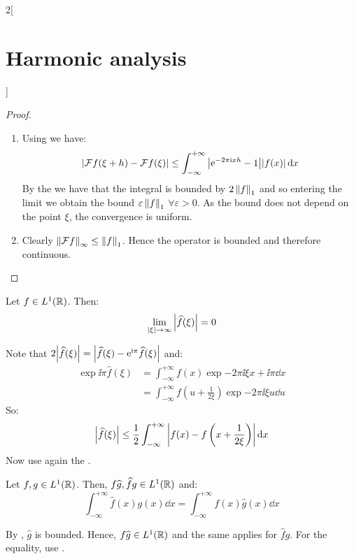 \documentclass[../../../main_math.tex]{subfiles}
\begin{document}
\begin{multicols}{2}[\section{Harmonic analysis}]
\begin{proposition}
  \end{proposition}
  \begin{proof}
    \begin{enumerate}
      \item Using  we have:
            $$\abs{\mathcal{F} f(\xi+h)-\mathcal{F} f(\xi)}\leq \int_{-\infty}^{+\infty}\abs{\mathrm{e}^{-2\pi\mathrm{i} x h}-1}\abs{f(x)}\dd{x}$$
            By the  we have that the integral is bounded by $2\left\|f\right\|_1$ and so entering the limit we obtain the bound $\varepsilon \left\|f\right\|_1$ $\forall \varepsilon>0$. As the bound does not depend on the point $\xi$, the convergence is uniform.
      \item Clearly $\left\|\mathcal{F} f\right\|_{\infty}\leq \left\|f\right\|_1$. Hence the operator is bounded and therefore continuous.
    \end{enumerate}
  \end{proof}
  \begin{theorem}\label{HA:riemannlebesgue}
    Let $f\in L^1(\mathbb{R})$. Then:
    $$\lim_{\abs{\xi}\to\infty} \abs{\widehat{f}(\xi)}=0$$
  \end{theorem}
  \begin{sproof}
    Note that $2\abs{\widehat{f}(\xi)}=\abs{\widehat{f}(\xi)-\mathrm{e}^{\mathrm{i}\pi}\widehat{f}(\xi)}$ and:
    \begin{align*}
      \exp{\ii\pi}\widehat{f}(\xi) & =\int_{-\infty}^{+\infty}f(x)\exp{-2\pi\ii\xi x+\ii\pi}\dd{x}                    \\
                                   & =\int_{-\infty}^{+\infty}f\left(u+\frac{1}{2\xi}\right)\exp{-2\pi\ii\xi u}\dd{u}
    \end{align*}
    So: $$\abs{\widehat{f}(\xi)}\leq\frac{1}{2}\int_{-\infty}^{+\infty}\left|f(x)-f\left(x+\frac{1}{2\xi}\right)\right|\dd{x}$$
    Now use again the .
  \end{sproof}
  \begin{proposition}\label{HA:symmetryFT}
    Let $f,g\in L^1(\mathbb{R})$. Then, $f\widehat{g},\widehat{f}g\in L^1(\mathbb{R})$ and:
    $$\int_{-\infty}^{+\infty}\widehat{f}(x)g(x)\dd{x}=\int_{-\infty}^{+\infty}f(x)\widehat{g}(x)\dd{x}$$
  \end{proposition}
  \begin{sproof}
    By , $\widehat{g}$ is bounded. Hence, $f\widehat{g}\in L^1(\mathbb{R})$ and the same applies for $\widehat{f}g$. For the equality, use .
  \end{sproof}
  \begin{proposition}\label{HA:diffFourierXf}

\end{proposition}
\end{multicols}
\end{document}
